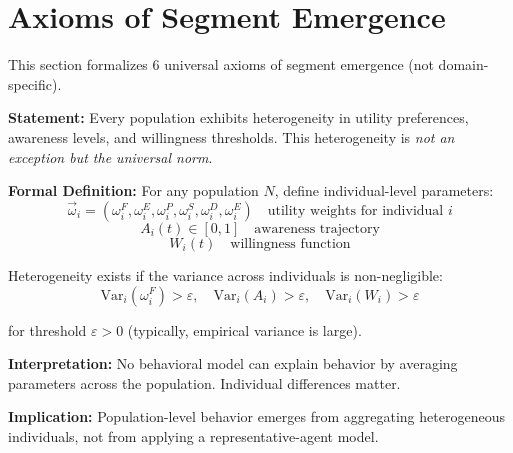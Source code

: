 \section{Axioms of Segment Emergence}
\label{sec:ba-genesis}

This section formalizes 6 universal axioms of segment emergence (not domain-specific).

\begin{tcolorbox}[colback=gray!5!white, colframe=gray!75!black,
    title=Axiom SEG-EMERGE-1: Universal Population Heterogeneity]

\textbf{Statement:}
Every population exhibits heterogeneity in utility preferences, awareness levels,
and willingness thresholds. This heterogeneity is \textit{not an exception but
the universal norm}.

\textbf{Formal Definition:}
For any population $N$, define individual-level parameters:
\begin{equation}
\vec{\omega}_i = (\omega^F_i, \omega^E_i, \omega^P_i, \omega^S_i, \omega^D_i, \omega^E_i)
\quad \text{utility weights for individual } i
\end{equation}
\begin{equation}
A_i(t) \in [0,1] \quad \text{awareness trajectory}
\end{equation}
\begin{equation}
W_i(t) \quad \text{willingness function}
\end{equation}

Heterogeneity exists if the variance across individuals is non-negligible:
\begin{equation}
\text{Var}_i(\omega^F_i) > \varepsilon, \quad \text{Var}_i(A_i) > \varepsilon, \quad
\text{Var}_i(W_i) > \varepsilon
\end{equation}

for threshold $\varepsilon > 0$ (typically, empirical variance is large).

\textbf{Interpretation:}
No behavioral model can explain behavior by averaging parameters across the
population. Individual differences matter.

\textbf{Implication:}
Population-level behavior emerges from aggregating heterogeneous individuals,
not from applying a representative-agent model.

\end{tcolorbox}

